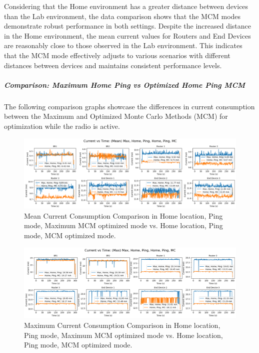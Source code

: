 Considering that the Home environment has a greater distance between devices than the Lab environment, the data comparison shows that the MCM modes demonstrate robust performance in both settings. Despite the increased distance in the Home environment, the mean current values for Routers and End Devices are reasonably close to those observed in the Lab environment. This indicates that the MCM mode effectively adjusts to various scenarios with different distances between devices and maintains consistent performance levels.

\subparagraph{Comparison: Maximum Home Ping vs Optimized Home Ping MCM}
The following comparison graphs showcase the differences in current consumption between the Maximum and Optimized Monte Carlo Methods (MCM) for optimization while the radio is active.

\begin{figure}[H]
  \centering
  \includegraphics[width=1\textwidth]{images/research_results/current_consumption_analysis/optimized/home/ping/mc/comparison/mean_comparison_home_ping_max_vs_home_ping_mc.png}
    \caption{Mean Current Consumption Comparison in Home location, Ping mode, Maximum MCM optimized mode vs. Home location, Ping mode, MCM optimized mode.}
    \label{fig:mean_comparison_home_ping_max_vs_home_ping_mc}
\end{figure}

\begin{figure}[H]
  \centering
  \includegraphics[width=1\textwidth]{images/research_results/current_consumption_analysis/optimized/home/ping/mc/comparison/max_comparison_home_ping_max_vs_home_ping_mc.png}
    \caption{Maximum Current Consumption Comparison in Home location, Ping mode, Maximum MCM optimized mode vs. Home location, Ping mode, MCM optimized mode.}
    \label{fig:max_comparison_home_ping_max_vs_home_ping_mc}
\end{figure}

